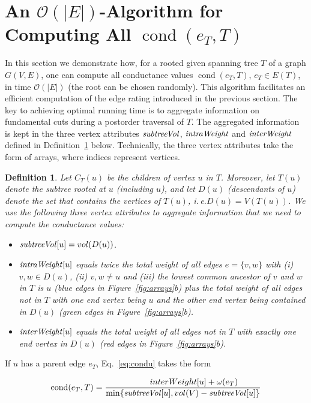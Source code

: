 \documentclass[pdftex]{llncs}
\newcommand{\ie}{i.\,e.\xspace}
\newtheorem{consDefinition}[example]{Definition}
\newcommand{\cond}{\operatorname{cond}}
\newcommand{\bigO}{\mathcal{O}}
\DeclareMathOperator{\intraWeight}{\it intraWeight}
\DeclareMathOperator{\interWeight}{\it interWeight}
\DeclareMathOperator{\subtreeVol}{\it subtreeVol}
\numberwithin{equation}{section}
\numberwithin{example}{section}
\numberwithin{table}{section}
\begin{document}
\section{An $\bigO(\vert E \vert)$-Algorithm for Computing All
  $\cond(e_T, T)$ }
\label{sec:effCond}
In this section we demonstrate how, for a rooted given spanning tree
$T$ of a graph $G(V, E)$, one can compute all conductance values
$\cond(e_T, T)$, $e_T \in E(T)$, in time $\bigO(\vert E \vert)$ (the
root can be chosen randomly). This algorithm facilitates an efficient
computation of the edge rating introduced in the previous section.
The key to achieving optimal running time is to aggregate information
on fundamental cuts during a postorder traversal of $T$. The
aggregated information is kept in the three vertex attributes
$\subtreeVol$, $\intraWeight$ and $\interWeight$ defined in
Definition~\ref{def:attributes} below.
Technically, the three vertex attributes take the form
of arrays, where indices represent vertices.

\begin{consDefinition} \label{def:attributes}
Let $C_T(u)$ be the children of vertex $u$ in $T$.  Moreover, let
$T(u)$ denote the subtree rooted at $u$ (including $u$), and let $D(u)$
(\emph{descendants of $u$}) denote the set that contains the vertices
of $T(u)$, \ie $D(u) = V(T(u))$. We use the following three vertex
attributes to aggregate information that we need to compute the
conductance values:
\begin{itemize}[noitemsep,nolistsep]
  \item $\subtreeVol[u] = vol(D(u))$.
  \item $\intraWeight[u]$ equals twice the total weight of all edges $e
    = \{v, w\}$ with (i) $v, w \in D(u)$, (ii) $v, w \neq u$ and (iii)
    the lowest common ancestor of $v$ and $w$ in $T$ is $u$ ({\color{blue}blue}
    edges in Figure~\ref{fig:arrays}b) plus the total weight of all
    edges not in $T$ with one end vertex being $u$ and the other end
    vertex being contained in $D(u)$ ({\color{ForestGreen}green} edges in
    Figure~\ref{fig:arrays}b).
  \item $\interWeight[u]$ equals the total weight of all edges not
    in $T$ with exactly one end vertex in $D(u)$ ({\color{red}red} edges in
    Figure~\ref{fig:arrays}b).
\end{itemize}
\end{consDefinition}
If $u$ has a parent edge $e_T$, Eq.~\ref{eq:condu} takes the form

\begin{equation}
\label{eq:condu2}
\cond(e_T, T) = \frac{\\interWeight[u] + \omega(e_T)}{\min\{\subtreeVol[u], vol(V)-\subtreeVol[u]\}}
\end{equation}
\end{document}
